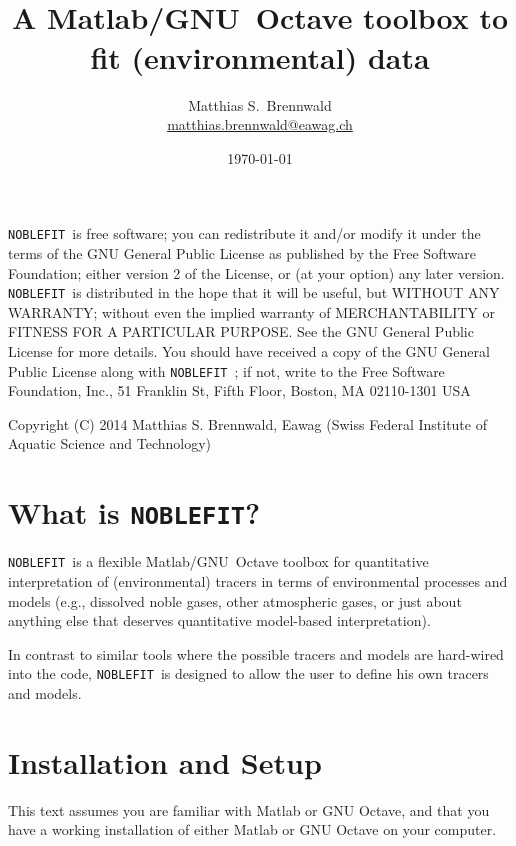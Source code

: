 \documentclass[12pt]{article}
\title{\Huge \noblefit\ \\[1ex]
\Large A Matlab/\mbox{GNU Octave} toolbox to fit (environmental) data}
\author{Matthias S.\ Brennwald\\ \url{matthias.brennwald@eawag.ch}
}
\date{\today}
\newcommand{\noblefit}{{\tt NOBLEFIT}}
\begin{document}
\maketitle
\tableofcontents \clearpage

\phantom{x}\vfill
{\footnotesize
\noblefit\  is free software; you can redistribute it and/or modify it under the terms of the GNU General Public License as published by the Free Software Foundation; either version 2 of the License, or (at your option) any later version.  \noblefit\  is distributed in the hope that it will be useful, but WITHOUT ANY WARRANTY; without even the implied warranty of MERCHANTABILITY or FITNESS FOR A PARTICULAR PURPOSE.  See the GNU General Public License for more details.  You should have received a copy of the GNU General Public License along with \noblefit\ ; if not, write to the Free Software Foundation, Inc., 51 Franklin St, Fifth Floor, Boston, MA  02110-1301 USA\par
Copyright (C) 2014 Matthias S. Brennwald, Eawag (Swiss Federal Institute of Aquatic Science and Technology)\par
}
\clearpage

\section{What is \noblefit?}
\noblefit\ is a flexible Matlab/\mbox{GNU Octave} toolbox for quantitative interpretation of (environmental) tracers in terms of environmental processes and models (e.g., dissolved noble gases, other atmospheric gases, or just about anything else that deserves quantitative model-based interpretation).\par

In contrast to similar tools\citep{Aeschbach:1999} where the possible tracers and models are hard-wired into the code, \noblefit\ is designed to allow the user to define his own tracers and models.

\section{Installation and Setup}
This text assumes you are familiar with Matlab or GNU Octave, and that you have a working installation of either Matlab or GNU Octave on your computer.
\end{document}
